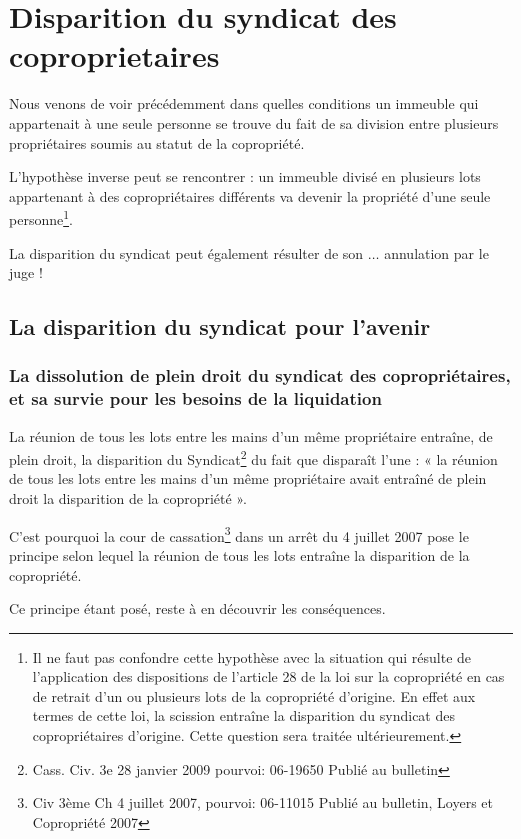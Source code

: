 \section{Disparition du syndicat des coproprietaires}

	Nous venons de voir précédemment dans quelles conditions un immeuble qui appartenait à une seule personne se trouve du fait de sa division entre plusieurs propriétaires soumis au statut de la copropriété.
	
	L’hypothèse inverse peut se rencontrer : un immeuble divisé en plusieurs lots appartenant à des copropriétaires différents va devenir la propriété d’une seule personne\footnote{Il ne faut pas confondre cette hypothèse avec la situation qui résulte de l’application des dispositions de l’article 28 de la loi sur la copropriété en cas de retrait d’un ou plusieurs lots de la copropriété d’origine. En effet aux termes de cette loi, la scission entraîne la disparition du syndicat des copropriétaires d’origine. Cette question sera traitée ultérieurement.}.
	
	La disparition du syndicat peut également résulter de son $\dots$ annulation par le juge !
	
	\subsection{La disparition du syndicat pour l’avenir}
	
		\subsubsection{La dissolution de plein droit du syndicat des copropriétaires, et sa survie pour les besoins de la liquidation}
		
			La réunion de tous les lots entre les mains d’un même propriétaire entraîne, de plein droit, la disparition du Syndicat\footnote{Cass. Civ. 3e 28 janvier 2009 pourvoi: 06-19650 Publié au bulletin} du fait que disparaît l’une : « la réunion de tous les lots entre les mains d'un même propriétaire avait entraîné de plein droit la disparition de la copropriété ».

			C’est pourquoi la cour de cassation\footnote{Civ 3ème Ch 4 juillet 2007, pourvoi: 06-11015 Publié au bulletin, Loyers et Copropriété 2007 } dans un arrêt du 4 juillet 2007 pose le principe selon lequel la réunion de tous les lots entraîne la disparition de la copropriété.
			
			Ce principe étant posé, reste à en découvrir les conséquences.
			
